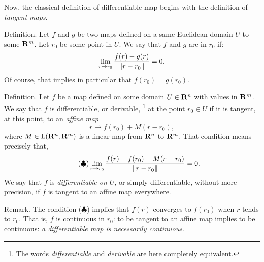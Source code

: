 Now,
the classical definition of differentiable map begins with the definition of \emph{tangent maps}.

\begin{Article}{Definition.}{\itshape}
  Let $f$ and $g$ be two maps defined on a same Euclidean domain $U$ to some $\mathbf{R}^m$.
  Let $r_0$ be some point in $U$.
  We say that $f$ and $g$ are  in $r_0$ if:
  $$%
    \lim_{r \to r_0} \frac{f(r) - g(r)}{\Norm{r-r_0}} = 0.
    $$%
  Of course,
  that implies in particular that $f(r_0) = g(r_0)$.
\end{Article}

\begin{Article}{Definition.}{\itshape}
  Let $f$ be a map defined on some domain $U \in \mathbf{R}^n$ with values in $\mathbf{R}^m$.
  We say that $f$ is \underline{differentiable},
  or \underline{derivable},%
  \footnote{The words {\itshape differentiable} and {\itshape derivable} are here completely equivalent.}
  at the point $r_0 \in U$ if it is tangent,
  at this point,
  to an \emph{affine map}
  $$%
    r \mapsto f(r_0) + M(r-r_0),
    $$%
  where $M \in \operatorname{L}(\mathbf{R}^n,\mathbf{R}^m)$ is a linear map from $\mathbf{R}^n$ to $\mathbf{R}^m$.
  That condition means precisely that,
  \begin{equation}\tag{$\clubsuit$}
    \lim_{r \to r_0} \frac{f(r)- f(r_0)- M(r-r_0)}{\Vert r-r_0 \Vert} = 0.
  \end{equation}
  We say that $f$ is \emph{differentiable on $U$},
  or simply differentiable,
  without more precision,
  if $f$ is tangent to an affine map everywhere.
\end{Article}

\begin{Article}{Remark.}{}\label{continuously-differentiable}
  The condition ($\clubsuit$) implies that $f(r)$ converges to $f(r_0)$ when $r$ tends to $r_0$.
  That is,
  $f$ is continuous in $r_0$:
  to be tangent to an affine map implies to be continuous:
  \emph{a differentiable map is necessarily continuous}.
\end{Article}

